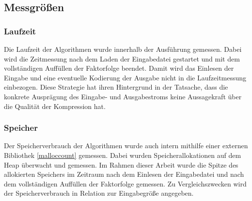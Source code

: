 \subsection{Messgrößen}

\subsubsection{Laufzeit}
Die Laufzeit der Algorithmen wurde innerhalb der Ausführung gemessen. Dabei wird die Zeitmessung nach dem Laden der Eingabedatei gestartet und mit dem vollständigen
Auffüllen der Faktorfolge beendet. Damit wird das Einlesen der Eingabe und eine eventuelle Kodierung der Ausgabe nicht in die Laufzeitmessung einbezogen. Diese Strategie
hat ihren Hintergrund in der Tatsache, dass die konkrete Ausprägung des Eingabe- und Ausgabestroms keine Aussagekraft über die Qualität der Kompression hat.

\subsubsection{Speicher}
Der Speicherverbrauch der Algorithmen wurde auch intern mithilfe einer externen Bibliothek \ref{malloccount} gemessen. Dabei wurden Speicherallokationen auf dem Heap 
überwacht und gemessen. Im Rahmen dieser Arbeit wurde die Spitze des allokierten Speichers im Zeitraum nach dem Einlesen der Eingabedatei und nach dem vollständigen 
Auffüllen der Faktorfolge gemessen. Zu Vergleichszwecken wird der Speicherverbrauch in Relation zur Eingabegröße angegeben.

